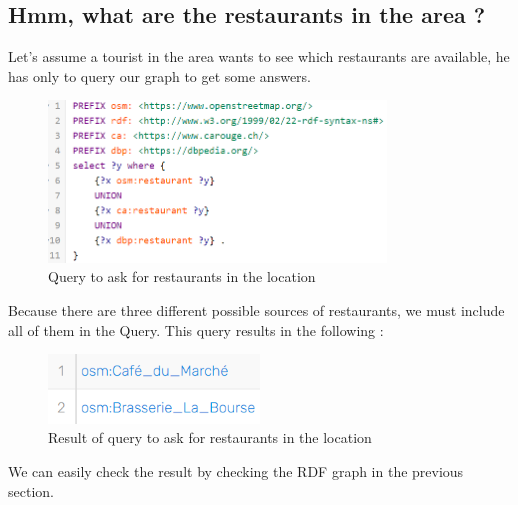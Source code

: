 \documentclass[a4paper]{article}
\begin{document}
\subsection*{Hmm, what are the restaurants in the area ?}
Let's assume a tourist in the area wants to see which restaurants are available, he has only to query our graph to get some answers.
\begin{figure}[H]
\center
\includegraphics*[width=0.8\textwidth]{images/restaurant_query.PNG}
\caption{Query to ask for restaurants in the location}
\end{figure}
Because there are three different possible sources of restaurants, we must include all of them in the Query. This query results in the following : 
\begin{figure}[H]
\center
\includegraphics*[width=0.5\textwidth]{images/restaurant_query_res.PNG}
\caption{Result of query to ask for restaurants in the location}
\end{figure}
We can easily check the result by checking the RDF graph in the previous section.

\newpage
\end{document}
